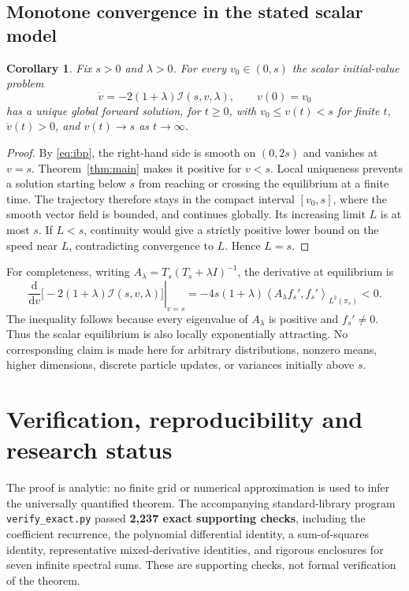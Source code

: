 \documentclass[11pt]{article}
\newtheorem{corollary}[theorem]{Corollary}
\theoremstyle{remark}
\newcommand{\Ical}{\mathcal I}
\newcommand{\ip}[2]{\left\langle #1,#2\right\rangle}
\begin{document}
\subsection{Monotone convergence in the stated scalar model}
\begin{corollary}\label{cor:flow}
Fix $s>0$ and $\lambda>0$. For every $v_0\in(0,s)$ the scalar initial-value problem
\[
 \dot v=-2(1+\lambda)\Ical(s,v,\lambda),\qquad v(0)=v_0
\]
has a unique global forward solution, for $t\ge0$, with $v_0\le v(t)<s$ for finite $t$, $\dot v(t)>0$, and $v(t)\to s$ as $t\to\infty$.
\end{corollary}
\begin{proof}
By \eqref{eq:ibp}, the right-hand side is smooth on $(0,2s)$ and vanishes at $v=s$.
Theorem~\ref{thm:main} makes it positive for $v<s$.
Local uniqueness prevents a solution starting below $s$ from reaching or crossing the equilibrium at a finite time. The trajectory therefore stays in the compact interval $[v_0,s]$, where the smooth vector field is bounded, and continues globally.
Its increasing limit $L$ is at most $s$. If $L<s$, continuity would give a strictly positive lower bound on the speed near $L$, contradicting convergence to $L$. Hence $L=s$.
\end{proof}
For completeness, writing $A_\lambda=T_s(T_s+\lambda I)^{-1}$, the derivative at equilibrium is
\[
 \left.\frac{\mathrm d}{\mathrm dv}\bigl[-2(1+\lambda)\Ical(s,v,\lambda)\bigr]\right|_{v=s}
 =-4s(1+\lambda)\ip{A_\lambda f_s'}{f_s'}_{L^2(\pi_s)}<0.
\]
The inequality follows because every eigenvalue of $A_\lambda$ is positive and $f_s'\ne0$.
Thus the scalar equilibrium is also locally exponentially attracting.
No corresponding claim is made here for arbitrary distributions, nonzero means, higher dimensions, discrete particle updates, or variances initially above $s$.

\section{Verification, reproducibility and research status}
The proof is analytic: no finite grid or numerical approximation is used to infer the universally quantified theorem.
The accompanying standard-library program \texttt{verify\_exact.py} passed \textbf{2,237 exact supporting checks}, including the coefficient recurrence, the polynomial differential identity, a sum-of-squares identity, representative mixed-derivative identities, and rigorous enclosures for seven infinite spectral sums.
These are supporting checks, not formal verification of the theorem.
\end{document}
